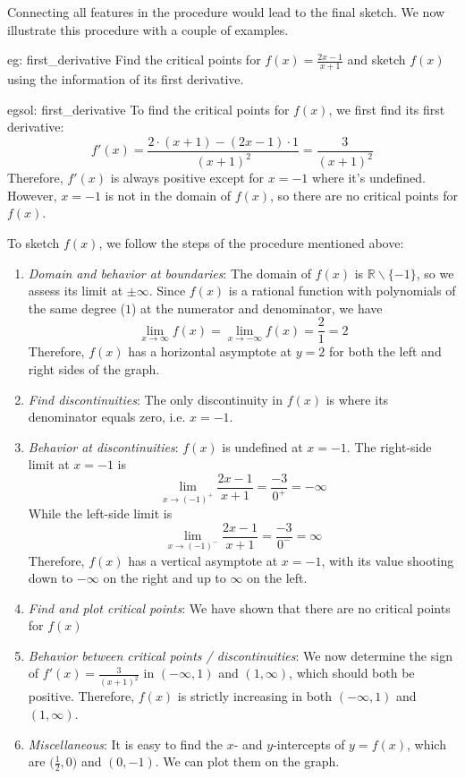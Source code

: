 Connecting all features in the procedure would lead to the final sketch. We now illustrate this procedure with a couple of examples.

\begin{eg}[]{eg: first_derivative}
    Find the critical points for $f(x) = \frac{2x-1}{x+1}$ and sketch $f(x)$ using the information of its first derivative.
\end{eg}

\begin{egsol}[]{egsol: first_derivative}
    To find the critical points for $f(x)$, we first find its first derivative:
    \[f'(x) = \frac{2 \cdot (x+1)-(2x-1) \cdot 1}{(x+1)^2} = \frac{3}{(x+1)^2}\]
    Therefore, $f'(x)$ is always positive except for $x = -1$ where it's undefined.  However, $x = -1$ is not in the domain of $f(x)$, so there are no critical points for $f(x)$.
    
    To sketch $f(x)$, we follow the steps of the procedure mentioned above:
    
    \begin{enumerate}
        \item \textit{Domain and behavior at boundaries}: The domain of $f(x)$ is $\mathbb{R} \backslash \{-1\}$, so we assess its limit at $\pm\infty$.  Since $f(x)$ is a rational function with polynomials of the same degree ($1$) at the numerator and denominator, we have
        \[\lim_{x \rightarrow \infty} f(x) = \lim_{x \rightarrow -\infty} f(x) = \frac{2}{1} = 2\]
        Therefore, $f(x)$ has a horizontal asymptote at $y = 2$ for both the left and right sides of the graph.
        \item \textit{Find discontinuities}: The only discontinuity in $f(x)$ is where its denominator equals zero, i.e. $x = -1$.
        \item \textit{Behavior at discontinuities}: $f(x)$ is undefined at $x=-1$.  The right-side limit at $x=-1$ is 
        \[\lim_{x \rightarrow (-1)^+} \frac{2x-1}{x+1} = \frac{-3}{0^+} = -\infty\]  
        While the left-side limit is
        \[\lim_{x \rightarrow (-1)^-} \frac{2x-1}{x+1} = \frac{-3}{0^-} = \infty\]
        Therefore, $f(x)$ has a vertical asymptote at $x = -1$, with its value shooting down to $-\infty$ on the right and up to $\infty$ on the left.
        \item \textit{Find and plot critical points}: We have shown that there are no critical points for $f(x)$
        \item \textit{Behavior between critical points / discontinuities}: We now determine the sign of $f'(x) = \frac{3}{(x+1)^2}$ in $(-\infty, 1)$ and $(1, \infty)$, which should both be positive.  Therefore, $f(x)$ is strictly increasing in both $(-\infty, 1)$ and $(1, \infty)$.
        \item \textit{Miscellaneous}: It is easy to find the $x$- and $y$-intercepts of $y=f(x)$, which are $\big(\frac{1}{2}, 0\big)$ and $(0, -1)$.  We can plot them on the graph.
    \end{enumerate}
    

\end{egsol}
